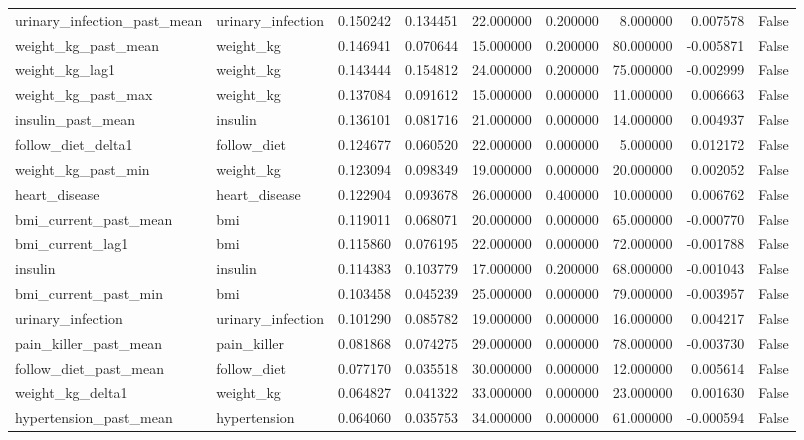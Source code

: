 \begin{longtable}{llrrrrrrr}
urinary\_infection\_past\_mean & urinary\_infection & 0.150242 & 0.134451 & 22.000000 & 0.200000 & 8.000000 & 0.007578 & False \\
weight\_kg\_past\_mean & weight\_kg & 0.146941 & 0.070644 & 15.000000 & 0.200000 & 80.000000 & -0.005871 & False \\
weight\_kg\_lag1 & weight\_kg & 0.143444 & 0.154812 & 24.000000 & 0.200000 & 75.000000 & -0.002999 & False \\
weight\_kg\_past\_max & weight\_kg & 0.137084 & 0.091612 & 15.000000 & 0.000000 & 11.000000 & 0.006663 & False \\
insulin\_past\_mean & insulin & 0.136101 & 0.081716 & 21.000000 & 0.000000 & 14.000000 & 0.004937 & False \\
follow\_diet\_delta1 & follow\_diet & 0.124677 & 0.060520 & 22.000000 & 0.000000 & 5.000000 & 0.012172 & False \\
weight\_kg\_past\_min & weight\_kg & 0.123094 & 0.098349 & 19.000000 & 0.000000 & 20.000000 & 0.002052 & False \\
heart\_disease & heart\_disease & 0.122904 & 0.093678 & 26.000000 & 0.400000 & 10.000000 & 0.006762 & False \\
bmi\_current\_past\_mean & bmi & 0.119011 & 0.068071 & 20.000000 & 0.000000 & 65.000000 & -0.000770 & False \\
bmi\_current\_lag1 & bmi & 0.115860 & 0.076195 & 22.000000 & 0.000000 & 72.000000 & -0.001788 & False \\
insulin & insulin & 0.114383 & 0.103779 & 17.000000 & 0.200000 & 68.000000 & -0.001043 & False \\
bmi\_current\_past\_min & bmi & 0.103458 & 0.045239 & 25.000000 & 0.000000 & 79.000000 & -0.003957 & False \\
urinary\_infection & urinary\_infection & 0.101290 & 0.085782 & 19.000000 & 0.000000 & 16.000000 & 0.004217 & False \\
pain\_killer\_past\_mean & pain\_killer & 0.081868 & 0.074275 & 29.000000 & 0.000000 & 78.000000 & -0.003730 & False \\
follow\_diet\_past\_mean & follow\_diet & 0.077170 & 0.035518 & 30.000000 & 0.000000 & 12.000000 & 0.005614 & False \\
weight\_kg\_delta1 & weight\_kg & 0.064827 & 0.041322 & 33.000000 & 0.000000 & 23.000000 & 0.001630 & False \\
hypertension\_past\_mean & hypertension & 0.064060 & 0.035753 & 34.000000 & 0.000000 & 61.000000 & -0.000594 & False \\

\end{longtable}

